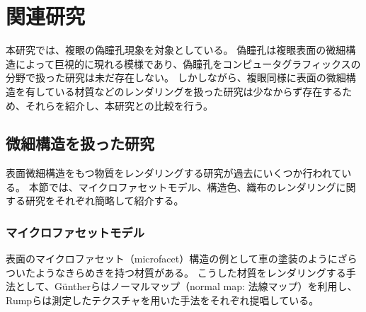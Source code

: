 \chapter{関連研究}
\label{CRelatedWork}

本研究では、複眼の偽瞳孔現象を対象としている。
偽瞳孔は複眼表面の微細構造によって巨視的に現れる模様であり、偽瞳孔をコンピュータグラフィックスの分野で扱った研究は未だ存在しない。
しかしながら、複眼同様に表面の微細構造を有している材質などのレンダリングを扱った研究は少なからず存在するため、それらを紹介し、本研究との比較を行う。

\section{微細構造を扱った研究}
\label{SMicrostructure}

表面微細構造をもつ物質をレンダリングする研究が過去にいくつか行われている。
本節では、マイクロファセットモデル、構造色、織布のレンダリングに関する研究をそれぞれ簡略して紹介する。

\subsection{マイクロファセットモデル}

表面のマイクロファセット（microfacet）構造の例として車の塗装のようにざらついたようなきらめきを持つ材質がある。
こうした材質をレンダリングする手法として、G\"{u}ntherら\cite{guenther05efficientacquisition}はノーマルマップ（normal map: 法線マップ）を利用し、Rumpら\cite{rump-2008-photo-realistic}は測定したテクスチャを用いた手法をそれぞれ提唱している。

